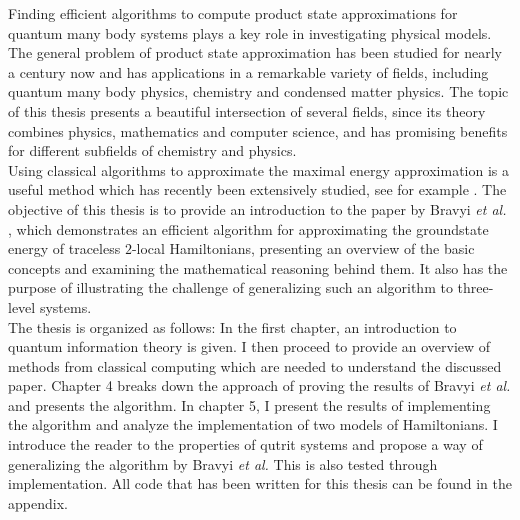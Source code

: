 Finding efficient algorithms to compute product state approximations for quantum many body systems plays a key role in investigating physical models.
The general problem of product state approximation has been studied for nearly a century now and has applications in a remarkable variety of fields, including quantum many body physics, chemistry and condensed matter physics.
The topic of this thesis presents a beautiful intersection of several fields, since its theory combines physics, mathematics and computer science, and has promising benefits for different subfields of chemistry and physics.\\
Using classical algorithms to approximate the maximal energy approximation is a useful method which has recently been extensively studied, see for example \cite{gharibian19, gharibian12, kempe06, brandao14, harrow17,bravyi19,anshu20}.
The objective of this thesis is to provide an introduction to the paper by Bravyi \emph{et al.} \cite{bravyi19}, which demonstrates an efficient algorithm for approximating the groundstate energy of traceless $2$-local Hamiltonians, presenting an overview of the basic concepts and examining the mathematical reasoning behind them.
It also has the purpose of illustrating the challenge of generalizing such an algorithm to three-level systems.\\
The thesis is organized as follows:
In the first chapter, an introduction to quantum information theory is given.
I then proceed to provide an overview of methods from classical computing which are needed to understand the discussed paper.
Chapter 4 breaks down the approach of proving the results of Bravyi \emph{et al.} and presents the algorithm.
In chapter 5, I present the results of implementing the algorithm and analyze the implementation of two models of Hamiltonians.
I introduce the reader to the properties of qutrit systems and propose a way of generalizing the algorithm by Bravyi \emph{et al.}
This is also tested through implementation.
All code that has been written for this thesis can be found in the appendix.
